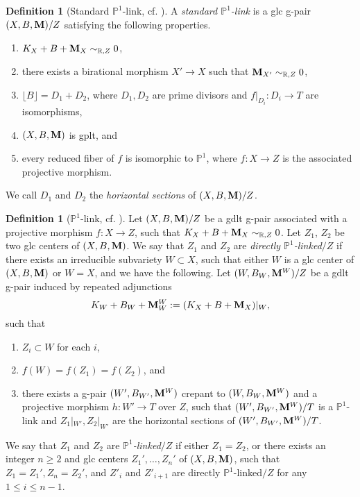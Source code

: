 \documentclass[11pt]{amsart}
\numberwithin{equation}{section}
\newcommand{\Mm}{{\bf{M}}}
\theoremstyle{definition}
\newtheorem{defn}[thm]{Definition}
\theoremstyle{definition}
\theoremstyle{definition}
\begin{document}
\begin{defn}[Standard $\mathbb P^1$-link, cf. {\cite[Definition
  2.21]{FS20}}]\label{defn: standard p1 link}
  A \emph{standard $\mathbb P^1$-link} is a glc g-pair $(X,B,\Mm)/Z$
  satisfying the following properties.
  \begin{enumerate}
    \item $K_X+B+\Mm_X\sim_{\mathbb R,Z}0$,
    \item there exists a birational morphism $X'\rightarrow X$ such
      that $\Mm_{X'}\sim_{\mathbb R,Z}0$,
    \item $\lfloor B\rfloor=D_1+D_2$, where $D_1,D_2$ are prime
      divisors and $f|_{D_i}: D_i\rightarrow T$ are isomorphisms,
    \item $(X,B,\Mm)$ is gplt, and
    \item every reduced fiber of $f$ is isomorphic to $\mathbb P^1$,
      where $f: X\rightarrow Z$ is the associated projective morphism.
  \end{enumerate}
  We call $D_1$ and $D_2$ the \emph{horizontal sections} of $(X,B,\Mm)/Z$.
\end{defn}

\begin{defn}[$\mathbb P^1$-link, cf. {\cite[Definition
  2.23]{FS20}}]\label{defn: p1 link}
  Let $(X,B,\Mm)/Z$ be a gdlt g-pair associated with a projective
  morphism $f: X\rightarrow Z$, such that $K_X+B+\Mm_X\sim_{\mathbb
  R,Z}0$. Let $Z_1$, $Z_2$ be two glc centers of $(X,B,\Mm)$. We say
  that $Z_1$ and $Z_2$ are \emph{directly $\mathbb P^1$-linked$/Z$}
  if there exists an irreducible subvariety $W\subset X$, such that
  either $W$ is a glc center of $(X,B,\Mm)$ or $W=X$, and we have the
  following. Let $(W,B_W,\Mm^W)/Z$ be a gdlt g-pair induced by
  repeated adjunctions
  $$K_W+B_W+\Mm^W_W:=(K_X+B+\Mm_X)|_W,$$
  such that
  \begin{enumerate}
    \item $Z_i\subset W$ for each $i$,
    \item $f(W)=f(Z_1)=f(Z_2)$, and
    \item there exists a g-pair $(W',B_{W'},\Mm^W)$ crepant to
      $(W,B_W,\Mm^W)$ and a projective morphism $h: W'\rightarrow T$
      over $Z$, such that $(W',B_{W'},\Mm^W)/T$ is a $\mathbb
      P^1$-link and $Z_1|_{W'},Z_2|_{W'}$ are the horizontal sections
      of $(W',B_{W'},\Mm^W)/T$.
  \end{enumerate}
  We say that $Z_1$ and $Z_2$ are \emph{$\mathbb P^1$-linked$/Z$} if
  either $Z_1=Z_2$, or there exists an integer $n\geq 2$ and glc
  centers $Z_1',\dots,Z_n'$ of $(X,B,\Mm)$, such that
  $Z_1=Z_1',Z_n=Z_2'$, and $Z'_i$ and $Z'_{i+1}$ are directly
  $\mathbb P^1$-linked$/Z$ for any $1\leq i\leq n-1$.
\end{defn}
\end{document}
